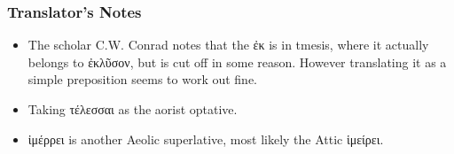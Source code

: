 \subsubsection*{Translator's Notes}
\begin{itemize}
  \item The scholar C.W. Conrad notes that the ἐκ is in tmesis, where it actually belongs to ἐκλῦσον, but is cut off in some reason. However translating it as a simple preposition seems to work out fine.
  \item Taking τέλεσσαι as the aorist optative.
  \item ἰμέρρει is another Aeolic superlative, most likely the Attic ἱμείρει.
\end{itemize}

